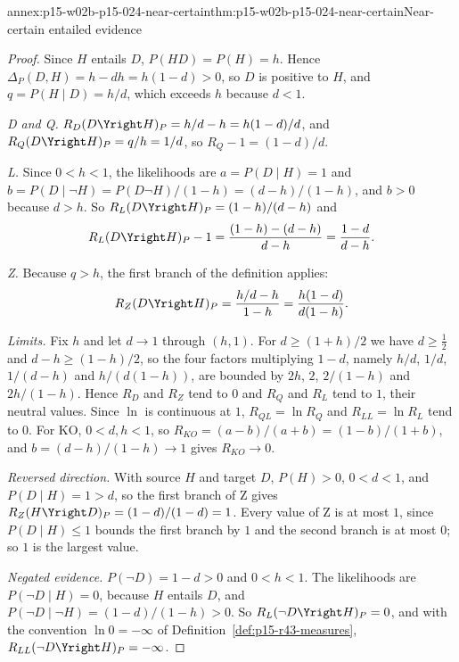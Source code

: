 \begin{annexitem}{annex:p15-w02b-p15-024-near-certain}{thm:p15-w02b-p15-024-near-certain}{Near-certain entailed evidence}
\begin{proof}
Since \(H\) entails \(D\), \(P(HD)=P(H)=h\). Hence
\(\Delta_P(D,H)=h-dh=h(1-d)>0\), so \(D\) is positive to \(H\), and
\(q=P(H\mid D)=h/d\), which exceeds \(h\) because \(d<1\).

\emph{D and Q.} \(R_D(D\Yright H)_P=h/d-h=h(1-d)/d\), and
\(R_Q(D\Yright H)_P=q/h=1/d\), so \(R_Q-1=(1-d)/d\).

\emph{L.} Since \(0<h<1\), the likelihoods are
\(a=P(D\mid H)=1\) and
\(b=P(D\mid\neg H)=P(D\neg H)/(1-h)=(d-h)/(1-h)\), and \(b>0\) because
\(d>h\). So \(R_L(D\Yright H)_P=(1-h)/(d-h)\) and
\[
 R_L(D\Yright H)_P-1=\frac{(1-h)-(d-h)}{d-h}=\frac{1-d}{d-h}.
\]

\emph{Z.} Because \(q>h\), the first branch of the definition applies:
\[
 R_Z(D\Yright H)_P=\frac{h/d-h}{1-h}=\frac{h(1-d)}{d(1-h)}.
\]

\emph{Limits.} Fix \(h\) and let \(d\to1\) through \((h,1)\). For
\(d\geq(1+h)/2\) we have \(d\geq\tfrac12\) and
\(d-h\geq(1-h)/2\), so the four factors multiplying \(1-d\), namely
\(h/d\), \(1/d\), \(1/(d-h)\) and \(h/(d(1-h))\), are bounded by
\(2h\), \(2\), \(2/(1-h)\) and \(2h/(1-h)\). Hence \(R_D\) and \(R_Z\)
tend to \(0\) and \(R_Q\) and \(R_L\) tend to \(1\), their neutral
values. Since \(\ln\) is continuous at \(1\), \(R_{QL}=\ln R_Q\) and
\(R_{LL}=\ln R_L\) tend to \(0\). For KO, \(0<d,h<1\), so
\(R_{KO}=(a-b)/(a+b)=(1-b)/(1+b)\), and \(b=(d-h)/(1-h)\to1\) gives
\(R_{KO}\to0\).

\emph{Reversed direction.} With source \(H\) and target \(D\),
\(P(H)>0\), \(0<d<1\), and \(P(D\mid H)=1>d\), so the first branch of
Z gives \(R_Z(H\Yright D)_P=(1-d)/(1-d)=1\). Every value of Z is at
most \(1\), since \(P(D\mid H)\leq1\) bounds the first branch by \(1\)
and the second branch is at most \(0\); so \(1\) is the largest value.

\emph{Negated evidence.} \(P(\neg D)=1-d>0\) and \(0<h<1\). The
likelihoods are \(P(\neg D\mid H)=0\), because \(H\) entails \(D\),
and \(P(\neg D\mid\neg H)=(1-d)/(1-h)>0\). So
\(R_L(\neg D\Yright H)_P=0\), and with the convention \(\ln0=-\infty\)
of Definition~\ref{def:p15-r43-measures},
\(R_{LL}(\neg D\Yright H)_P=-\infty\).
\end{proof}
\end{annexitem}

